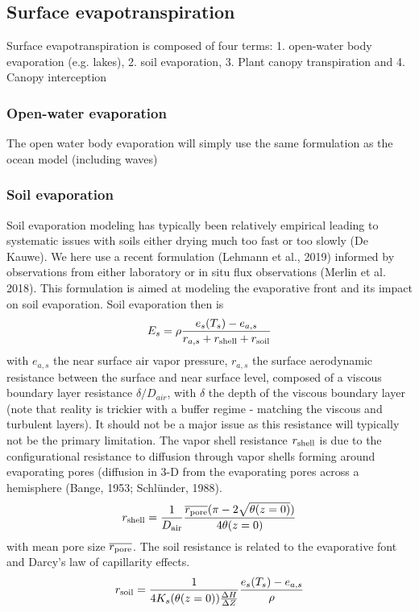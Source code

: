 \documentclass{article}
\begin{document}
\subsection{Surface evapotranspiration}
Surface evapotranspiration is composed of four terms: 1. open-water body evaporation (e.g. lakes), 2. soil evaporation, 3. Plant canopy transpiration and 4. Canopy interception
\subsubsection{Open-water evaporation}
The open water body evaporation will simply use the same formulation as the ocean model (including waves)
\subsubsection{Soil evaporation}
Soil evaporation modeling has typically been relatively empirical leading to systematic issues with soils either drying much too fast or too slowly (De Kauwe). We here use a recent formulation (Lehmann et al., 2019) informed by observations from either laboratory or in situ flux observations (Merlin et al. 2018). This formulation is aimed at modeling the evaporative front and its impact on soil evaporation. 
Soil evaporation then is 
\begin{equation}
    E_s = \rho \frac{e_s(T_s)-e_{a,s}}{r_{a,s}+r_{\rm shell}+r_{\rm soil}}
\end{equation}
with $e_{a,s}$ the near surface air vapor pressure, $r_{a,s}$ the surface aerodynamic resistance between the surface and near surface level, composed of a viscous boundary layer resistance $\delta /D_{air}$, with $\delta$ the depth of the viscous boundary layer (note that reality is trickier with a buffer regime - matching the viscous and turbulent layers). It should not be a major issue as this resistance will typically not be the primary limitation. The vapor shell resistance $r_{\rm shell}$ is due to the configurational resistance to diffusion through vapor shells forming around evaporating pores (diffusion in 3-D from the evaporating pores across a hemisphere (Bange, 1953; Schlünder, 1988).
\begin{equation}
    r_{\rm shell} = \frac{1}{D_{\rm air}}\frac{\overline{r_{\rm pore}}(\pi-2\sqrt{\theta(z=0)})}{4\theta(z=0)}
\end{equation}
with mean pore size $\overline{r_{\rm pore}}$.
The soil resistance is related to the evaporative font and Darcy's law of capillarity effects.
\begin{equation}
    r_{\rm soil} = \frac{1}{4 K_s(\theta(z=0))\frac{\Delta H}{\Delta Z}}\frac{e_s(T_s)-e_{a,s}}{\rho}
\end{equation}
\end{document}
